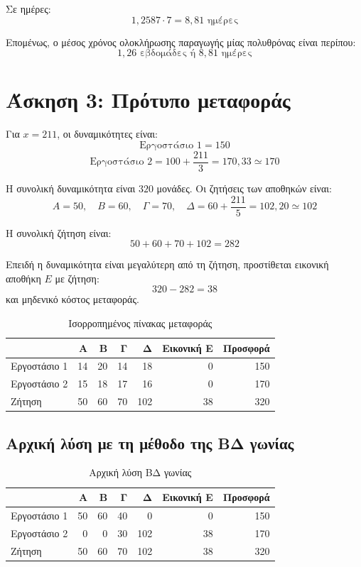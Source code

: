 \documentclass[12pt,a4paper]{article}
\begin{document}
Σε ημέρες:
\[
1{,}2587 \cdot 7=8{,}81 \text{ ημέρες}
\]

Επομένως, ο μέσος χρόνος ολοκλήρωσης παραγωγής μίας πολυθρόνας είναι περίπου:
\[
\boxed{1{,}26 \text{ εβδομάδες ή } 8{,}81 \text{ ημέρες}}
\]

\section{Άσκηση 3: Πρότυπο μεταφοράς}

Για \(x=211\), οι δυναμικότητες είναι:
\[
\text{Εργοστάσιο 1}=150
\]
\[
\text{Εργοστάσιο 2}=100+\frac{211}{3}=170{,}33 \simeq 170
\]

Η συνολική δυναμικότητα είναι \(320\) μονάδες. Οι ζητήσεις των αποθηκών είναι:
\[
A=50,\quad B=60,\quad \Gamma=70,\quad \Delta=60+\frac{211}{5}=102{,}20 \simeq 102
\]

Η συνολική ζήτηση είναι:
\[
50+60+70+102=282
\]

Επειδή η δυναμικότητα είναι μεγαλύτερη από τη ζήτηση, προστίθεται εικονική αποθήκη \(E\) με ζήτηση:
\[
320-282=38
\]
και μηδενικό κόστος μεταφοράς.

\begin{table}[H]
\centering
\caption{Ισορροπημένος πίνακας μεταφοράς}
\begin{tabular}{lrrrrrr}
\toprule
 & \textbf{Α} & \textbf{Β} & \textbf{Γ} & \textbf{Δ} & \textbf{Εικονική Ε} & \textbf{Προσφορά} \\
\midrule
Εργοστάσιο 1 & 14 & 20 & 14 & 18 & 0 & 150 \\
Εργοστάσιο 2 & 15 & 18 & 17 & 16 & 0 & 170 \\
\midrule
Ζήτηση & 50 & 60 & 70 & 102 & 38 & 320 \\
\bottomrule
\end{tabular}
\end{table}

\subsection{Αρχική λύση με τη μέθοδο της ΒΔ γωνίας}

\begin{table}[H]
\centering
\caption{Αρχική λύση ΒΔ γωνίας}
\begin{tabular}{lrrrrrr}
\toprule
 & \textbf{Α} & \textbf{Β} & \textbf{Γ} & \textbf{Δ} & \textbf{Εικονική Ε} & \textbf{Προσφορά} \\
\midrule
Εργοστάσιο 1 & 50 & 60 & 40 & 0 & 0 & 150 \\
Εργοστάσιο 2 & 0 & 0 & 30 & 102 & 38 & 170 \\
\midrule
Ζήτηση & 50 & 60 & 70 & 102 & 38 & 320 \\
\bottomrule
\end{tabular}
\end{table}
\end{document}
